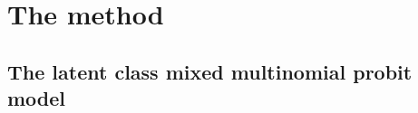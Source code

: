 \documentclass[article]{jss}
\begin{document}


\section{The method} \label{sec:method}

\subsection{The latent class mixed multinomial probit model} \label{subsec:model}
\end{document}
